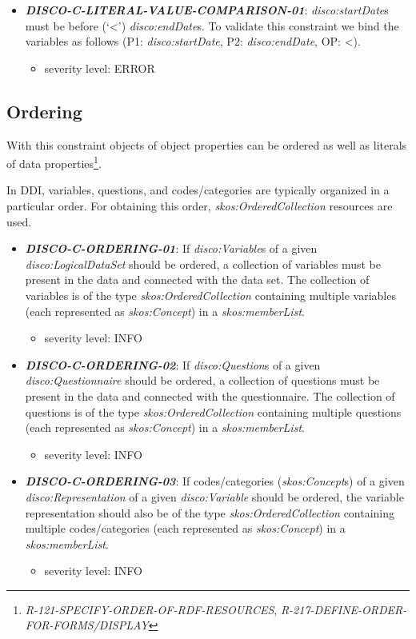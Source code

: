 \documentclass{llncs}
\begin{document}
\begin{itemize}
	\item \textbf{{\em DISCO-C-LITERAL-VALUE-COMPARISON-01}}:
{\em disco:startDate}s must be before (‘\textless’) {\em disco:endDate}s.
To validate this constraint we bind the variables as follows (P1: {\em disco:startDate}, P2: {\em disco:endDate}, OP: \textless). 
	\begin{itemize}
		\item severity level: ERROR
	\end{itemize}
\end{itemize}

\subsection{Ordering}

With this constraint objects of object properties can be ordered as well as literals of data properties\footnote{\emph{R-121-SPECIFY-ORDER-OF-RDF-RESOURCES}, \emph{R-217-DEFINE-ORDER-FOR-FORMS/DISPLAY}}.

In DDI, variables, questions, and codes/categories are typically organized in a particular order. 
For obtaining this order, {\em skos:OrderedCollection} resources are used. 

\begin{itemize}
	\item \textbf{{\em DISCO-C-ORDERING-01}}: If \emph{disco:Variable}s of a given \emph{disco:LogicalDataSet} should be ordered, a collection of variables must be present in the data and connected with the data set. The collection of variables is of the type {\em skos:OrderedCollection} containing multiple variables (each represented as {\em skos:Concept}) in a {\em skos:memberList}. 
	\begin{itemize}
		\item severity level: INFO
	\end{itemize}
	\item \textbf{{\em DISCO-C-ORDERING-02}}: If \emph{disco:Question}s of a given \emph{disco:Questionnaire} should be ordered, a collection of questions must be present in the data and connected with the questionnaire. The collection of questions is of the type {\em skos:OrderedCollection} containing multiple questions (each represented as {\em skos:Concept}) in a {\em skos:memberList}. 
	\begin{itemize}
		\item severity level: INFO
	\end{itemize}
	\item \textbf{{\em DISCO-C-ORDERING-03}}: If codes/categories (\emph{skos:Concept}s) of a given \emph{disco:Representation} of a given \emph{disco:Variable} should be ordered, the variable representation should also be of the type {\em skos:OrderedCollection} containing multiple codes/categories (each represented as {\em skos:Concept}) in a {\em skos:memberList}. 
	\begin{itemize}
		\item severity level: INFO
	\end{itemize}
\end{itemize}
\end{document}
